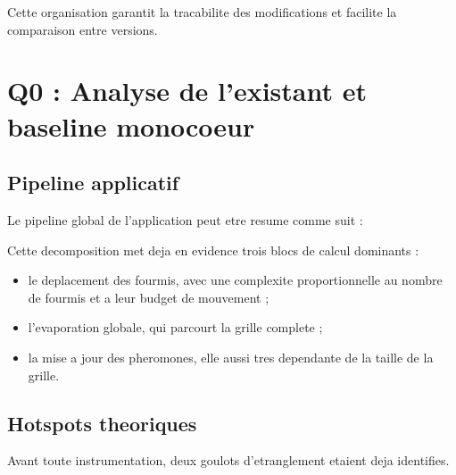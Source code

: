 \documentclass[11pt,a4paper]{article}
\begin{document}
Cette organisation garantit la tracabilite des modifications et facilite la comparaison entre versions.

\section{Q0 : Analyse de l'existant et baseline monocoeur}

\subsection{Pipeline applicatif}

Le pipeline global de l'application peut etre resume comme suit :

\begin{center}
\end{center}

Cette decomposition met deja en evidence trois blocs de calcul dominants :

\begin{itemize}[leftmargin=1.2em]
  \item le deplacement des fourmis, avec une complexite proportionnelle au nombre de fourmis et a leur budget de mouvement ;
  \item l'evaporation globale, qui parcourt la grille complete ;
  \item la mise a jour des pheromones, elle aussi tres dependante de la taille de la grille.
\end{itemize}

\subsection{Hotspots theoriques}

Avant toute instrumentation, deux goulots d'etranglement etaient deja identifies.
\end{document}
